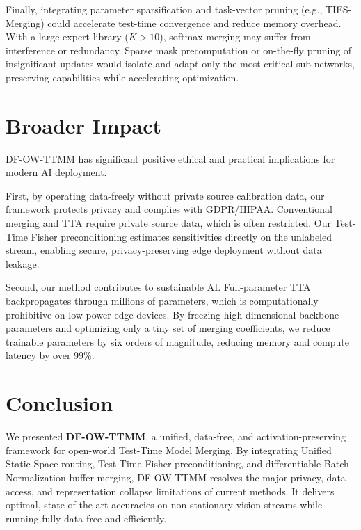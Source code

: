 \documentclass{article}
\theoremstyle{plain}
\theoremstyle{definition}
\theoremstyle{remark}
\begin{document}
Finally, integrating parameter sparsification and task-vector pruning (e.g., TIES-Merging) could accelerate test-time convergence and reduce memory overhead. With a large expert library ($K > 10$), softmax merging may suffer from interference or redundancy. Sparse mask precomputation or on-the-fly pruning of insignificant updates would isolate and adapt only the most critical sub-networks, preserving capabilities while accelerating optimization.

\section{Broader Impact}
DF-OW-TTMM has significant positive ethical and practical implications for modern AI deployment.

First, by operating data-freely without private source calibration data, our framework protects privacy and complies with GDPR/HIPAA. Conventional merging and TTA require private source data, which is often restricted. Our Test-Time Fisher preconditioning estimates sensitivities directly on the unlabeled stream, enabling secure, privacy-preserving edge deployment without data leakage.

Second, our method contributes to sustainable AI. Full-parameter TTA backpropagates through millions of parameters, which is computationally prohibitive on low-power edge devices. By freezing high-dimensional backbone parameters and optimizing only a tiny set of merging coefficients, we reduce trainable parameters by six orders of magnitude, reducing memory and compute latency by over 99\%.

\section{Conclusion}
We presented \textbf{DF-OW-TTMM}, a unified, data-free, and activation-preserving framework for open-world Test-Time Model Merging. By integrating Unified Static Space routing, Test-Time Fisher preconditioning, and differentiable Batch Normalization buffer merging, DF-OW-TTMM resolves the major privacy, data access, and representation collapse limitations of current methods. It delivers optimal, state-of-the-art accuracies on non-stationary vision streams while running fully data-free and efficiently.

\clearpage



\clearpage
\appendix
\onecolumn
\end{document}
